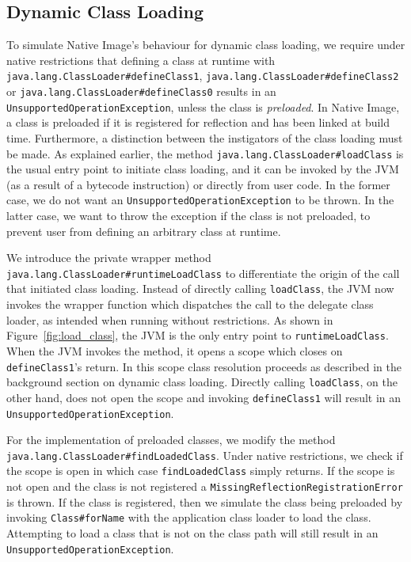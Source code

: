\subsection{Dynamic Class Loading}
To simulate Native Image's behaviour for dynamic class loading, we require under native restrictions that defining a class at runtime with \verb|java.lang.ClassLoader#defineClass1|, \verb|java.lang.ClassLoader#defineClass2| or \verb|java.lang.ClassLoader#defineClass0| results in an \verb|UnsupportedOperationException|, unless the class is \emph{preloaded}. In Native Image, a class is preloaded if it is registered for reflection and has been linked at build time. 
Furthermore, a distinction between the instigators of the class loading must be made. As explained earlier, the method \verb|java.lang.ClassLoader#loadClass| is the usual entry point to initiate class loading, and it can be invoked by the JVM (as a result of a bytecode instruction) or directly from user code. In the former case, we do not want an \verb|UnsupportedOperationException| to be thrown. In the latter case, we want to throw the exception if the class is not preloaded, to prevent user from defining an arbitrary class at runtime.

We introduce the private wrapper method \verb|java.lang.ClassLoader#runtimeLoadClass| to differentiate the origin of the call that initiated class loading. Instead of directly calling \verb|loadClass|, the JVM now invokes the wrapper function which dispatches the call to the delegate class loader, as intended when running without restrictions. As shown in Figure~\ref{fig:load_class}, the JVM is the only entry point to \verb|runtimeLoadClass|. When the JVM invokes the method, it opens a scope which closes on \verb|defineClass1|'s return. In this scope class resolution proceeds as described in the background section on dynamic class loading. 
Directly calling \verb|loadClass|, on the other hand, does not open the scope and invoking \verb|defineClass1| will result in an \verb|UnsupportedOperationException|.

For the implementation of preloaded classes, we modify the method \verb|java.lang.ClassLoader#findLoadedClass|.
Under native restrictions, we check if the scope is open in which case \verb|findLoadedClass| simply returns. If the scope is not open and the class is not registered a \verb|MissingReflectionRegistrationError| is thrown. If the class is registered, then we simulate the class being preloaded by invoking \verb|Class#forName| with the application class loader to load the class. Attempting to load a class that is not on the class path will still result in an \verb|UnsupportedOperationException|.

